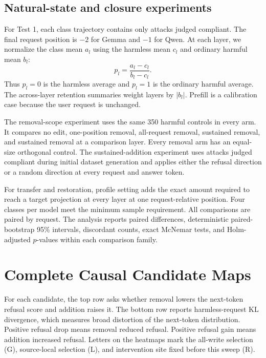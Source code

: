 \documentclass{article}
\begin{document}
\subsection{Natural-state and closure experiments}

For Test 1, each class trajectory contains only attacks judged compliant. The final request position is $-2$ for Gemma and $-1$ for Qwen. At each layer, we normalize the class mean $a_l$ using the harmless mean $c_l$ and ordinary harmful mean $b_l$:
\begin{equation}
  p_l = \frac{a_l-c_l}{b_l-c_l}.
\end{equation}
Thus $p_l=0$ is the harmless average and $p_l=1$ is the ordinary harmful average. The across-layer retention summaries weight layers by $|b_l|$. Prefill is a calibration case because the user request is unchanged.

The removal-scope experiment uses the same 350 harmful controls in every arm. It compares no edit, one-position removal, all-request removal, sustained removal, and sustained removal at a comparison layer. Every removal arm has an equal-size orthogonal control. The sustained-addition experiment uses attacks judged compliant during initial dataset generation and applies either the refusal direction or a random direction at every request and answer token.

For transfer and restoration, profile setting adds the exact amount required to reach a target projection at every layer at one request-relative position. Four classes per model meet the minimum sample requirement. All comparisons are paired by request. The analysis reports paired differences, deterministic paired-bootstrap 95\% intervals, discordant counts, exact McNemar tests, and Holm-adjusted $p$-values within each comparison family.

\section{Complete Causal Candidate Maps}
\label{app:causal-maps}

For each candidate, the top row asks whether removal lowers the next-token refusal score and addition raises it. The bottom row reports harmless-request KL divergence, which measures broad distortion of the next-token distribution. Positive refusal drop means removal reduced refusal. Positive refusal gain means addition increased refusal. Letters on the heatmaps mark the all-write selection (G), source-local selection (L), and intervention site fixed before this sweep (R).
\end{document}
